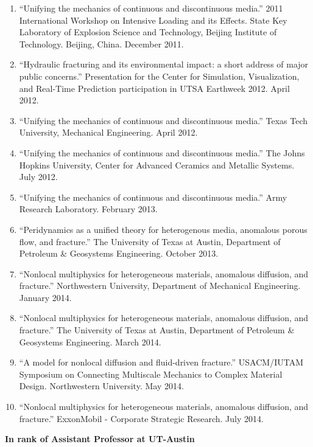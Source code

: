 \begin{enumerate}[resume]
    \item ``Unifying the mechanics of continuous and discontinuous media.''  2011 International Workshop on Intensive Loading and its Effects.  State Key Laboratory of Explosion Science and Technology, Beijing Institute of Technology.  Beijing, China. December 2011.
    \item ``Hydraulic fracturing and its environmental impact: a short address of major public concerns.'' Presentation for the Center for Simulation, Visualization, and Real-Time Prediction participation in UTSA Earthweek 2012.  April 2012.
    \item ``Unifying the mechanics of continuous and discontinuous media.''  Texas Tech University, Mechanical Engineering.  April 2012.
    \item ``Unifying the mechanics of continuous and discontinuous media.''  The Johns Hopkins University, Center for Advanced Ceramics and Metallic Systems.  July 2012.
    \item ``Unifying the mechanics of continuous and discontinuous media.''  Army Research Laboratory.  February 2013.
    \item ``Peridynamics as a unified theory for heterogenous media, anomalous porous flow, and fracture.'' The University of Texas at Austin, Department of Petroleum \& Geosystems Engineering. October 2013.
    \item ``Nonlocal multiphysics for heterogeneous materials, anomalous diffusion, and fracture.'' Northwestern University, Department of Mechanical Engineering. January 2014.
    \item ``Nonlocal multiphysics for heterogeneous materials, anomalous diffusion, and fracture.'' The University of Texas at Austin, Department of Petroleum \& Geosystems Engineering. March 2014.
    \item ``A model for nonlocal diffusion and fluid-driven fracture.'' USACM/IUTAM Symposium on Connecting Multiscale Mechanics to Complex Material Design. Northwestern University. May 2014.
    \item ``Nonlocal multiphysics for heterogeneous materials, anomalous diffusion, and fracture.'' ExxonMobil - Corporate Strategic Research. July 2014.
\end{enumerate}
    \pagebreak[2]
    \textbf{In rank of Assistant Professor at UT-Austin}
